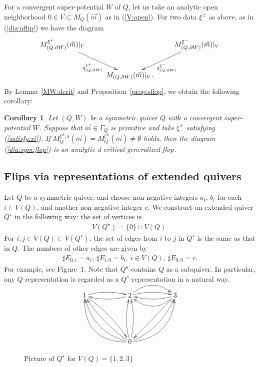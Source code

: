 \documentclass[11pt]{amsart}
\theoremstyle{plain}
\newtheorem{cor}[thm]{Corollary}
\theoremstyle{definition}
\theoremstyle{remark}
\begin{document}
For a convergent super-potential $W$ of $Q$, 
let us take an analytic open neighborhood
$0 \in V \subset M_Q(\vec{m})$ as in (\ref{V:open}). 
For two data $\xi^{\pm}$ as above, 
as in (\ref{dia:qflip}) we have the 
diagram 
\begin{align}\label{dia:sym:flop}
\xymatrix{
M_{(Q, \partial W)}^{\xi^{+}}(\vec{m})|_{V} 
\ar[rd]_-{q_{(Q, \partial W)}^{\xi^{+}}} & & 
\ar[dl]^-{q_{(Q, \partial W)}^{\xi^{-}}}
M_{(Q, \partial W)}^{\xi^{-}}(\vec{m})|_{V} \\
&  M_{(Q, \partial W)}(\vec{m})|_{V}. &
}
\end{align}
By Lemma~\ref{MW:dcrit}
and Proposition~\ref{prop:sflop}, we obtain the following corollary: 
\begin{cor}\label{cor:dflop}
Let $(Q, W)$ be a symmetric quiver $Q$ with a convergent 
super-potential $W$. 
Suppose that $\vec{m} \in \Gamma_Q$ is primitive and 
take $\xi^{\pm}$ satisfying (\ref{satisfy:xi}). 
If
$M_{Q}^{\xi^{\pm}, s}(\vec{m})=M_Q^{\xi^{\pm}}(\vec{m}) \neq \emptyset$
holds, 
then the diagram (\ref{dia:sym:flop}) is an analytic d-critical 
generalized flop. 
\end{cor}
\subsection{Flips via representations of extended quivers}\label{subsec:extend}
Let $Q$ be a symmetric quiver, and 
choose non-negative integers $a_i$, $b_i$
for each $i \in V(Q)$, and another non-negative integer $c$. 
We construct an extended quiver $Q^{\star}$ 
in the following way: 
the set of vertices is 
\begin{align*}
V(Q^{\star})=\{0\} \sqcup V(Q). 
\end{align*}
For $i, j \in V(Q) \subset V(Q^{\star})$, the 
set of edges from $i$ to $j$ in $Q^{\star}$ is the same 
as that in $Q$. The numbers of other edges are given by
\begin{align*}
\sharp E_{0, i}=a_i, \ \sharp E_{i, 0}=b_i, \ i \in V(Q), 
\ \sharp E_{0, 0}=c.  
\end{align*}
For example, see Figure~1. 
Note that $Q^{\star}$ contains $Q$ as a subquiver. 
In particular, any $Q$-representation is 
regarded as a $Q^{\star}$-representation in a natural way. 

\begin{figure}\label{figure:Q}
\begin{align*}
\xymatrix{
1    \ar@/^5pt/[rr] \ar@/^5pt/[ddrr] 
&& \ar@/^5pt/[ll]
2 \ar@/^5pt/[rr] \ar@/^15pt/[rr] 
&& \ar@/^5pt/[ll] \ar@/^15pt/[ll]
\ar[lldd]
3 \\ \\
&& 0 \ar@/^15pt/[uull] \ar@/^5pt/[uu] \ar@/_5pt/[uu]
\ar@/_20pt/[uurr]
\ar@/_10pt/[uurr]
\ar@/^25pt/[uull]
\ar@/^5pt/[uull]  
  && 
 }
\end{align*}
\caption{Picture of $Q^{\star}$
for $V(Q)=\{1, 2, 3\}$}
\end{figure}
\end{document}
